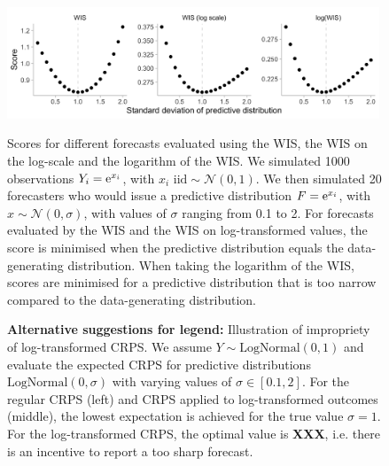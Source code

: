 \documentclass{article}
\begin{document}
\begin{figure}[h!]
    \centering
    \includegraphics[width=0.99\textwidth]{output/figures/example-log-first.png}
    \caption{Scores for different forecasts evaluated using the WIS, the WIS on the log-scale and the logarithm of the WIS. We simulated 1000 observations $Y_i = {\rm e}^{x_i}$, with $x_i \text{ iid} \sim \mathcal{N}(0, 1)$. We then simulated 20 forecasters who would issue a predictive distribution $F = {\rm e}^{x_i}$, with $x \sim \mathcal{N}(0, \sigma)$, with values of $\sigma$ ranging from 0.1 to 2. For forecasts evaluated by the WIS and the WIS on log-transformed values, the score is minimised when the predictive distribution equals the data-generating distribution. When taking the logarithm of the WIS, scores are minimised for a predictive distribution that is too narrow compared to the data-generating distribution.}
    \caption{\textbf{Alternative suggestions for legend:} Illustration of impropriety of log-transformed CRPS. We assume $Y \sim \text{LogNormal}(0, 1)$ and evaluate the expected CRPS for predictive distributions $\text{LogNormal}(0, \sigma)$ with varying values of $\sigma \in [0.1, 2]$. For the regular CRPS (left) and CRPS applied to log-transformed outcomes (middle), the lowest expectation is achieved for the true value $\sigma = 1$. For the log-transformed CRPS, the optimal value is \textbf{XXX}, i.e. there is an incentive to report a too sharp forecast.}
    \label{fig:log-improper}
\end{figure}
\end{document}
